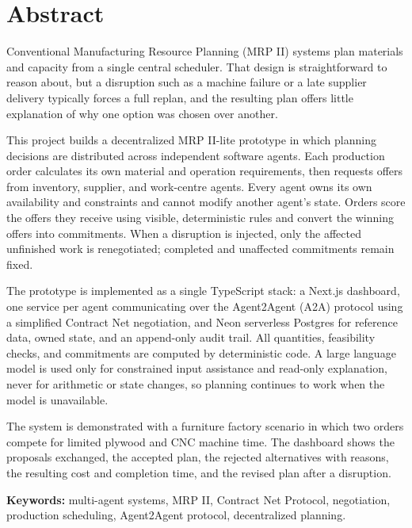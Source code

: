 \chapter*{Abstract}

Conventional Manufacturing Resource Planning (MRP II) systems plan materials
and capacity from a single central scheduler. That design is straightforward to
reason about, but a disruption such as a machine failure or a late supplier
delivery typically forces a full replan, and the resulting plan offers little
explanation of why one option was chosen over another.

This project builds a decentralized MRP II-lite prototype in which planning
decisions are distributed across independent software agents. Each production
order calculates its own material and operation requirements, then requests
offers from inventory, supplier, and work-centre agents. Every agent owns its
own availability and constraints and cannot modify another agent's state.
Orders score the offers they receive using visible, deterministic rules and
convert the winning offers into commitments. When a disruption is injected,
only the affected unfinished work is renegotiated; completed and unaffected
commitments remain fixed.

The prototype is implemented as a single TypeScript stack: a Next.js dashboard,
one service per agent communicating over the Agent2Agent (A2A) protocol using a
simplified Contract Net negotiation, and Neon serverless Postgres for reference
data, owned state, and an append-only audit trail. All quantities, feasibility
checks, and commitments are computed by deterministic code. A large language
model is used only for constrained input assistance and read-only explanation,
never for arithmetic or state changes, so planning continues to work when the
model is unavailable.

The system is demonstrated with a furniture factory scenario in which two
orders compete for limited plywood and CNC machine time. The dashboard shows
the proposals exchanged, the accepted plan, the rejected alternatives with
reasons, the resulting cost and completion time, and the revised plan after a
disruption.

\vspace{0.5cm}
\noindent\textbf{Keywords:} multi-agent systems, MRP II, Contract Net
Protocol, negotiation, production scheduling, Agent2Agent protocol,
decentralized planning.

\clearpage
